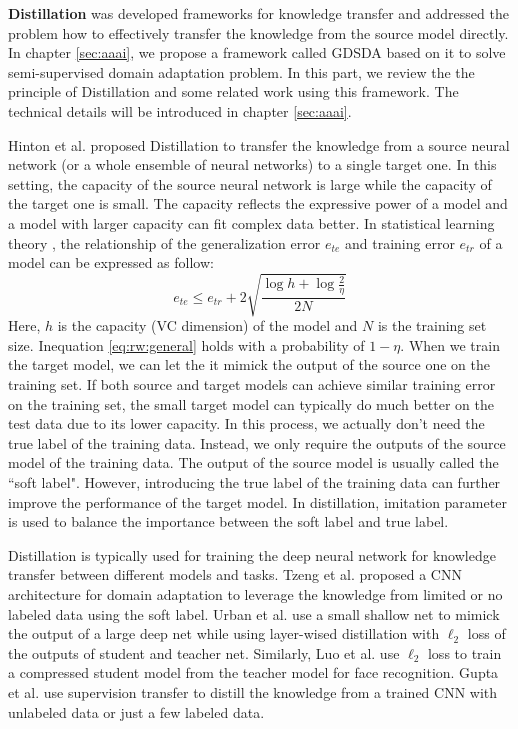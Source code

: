 \textbf{Distillation} \cite{hinton2015distilling} was developed frameworks for knowledge transfer and addressed the problem how to effectively transfer the knowledge from the source model directly. In chapter \ref{sec:aaai}, we propose a framework called GDSDA based on it to solve semi-supervised domain adaptation problem. In this part, we review the the principle of Distillation and some related work using this framework. The technical details will be introduced in chapter \ref{sec:aaai}.

Hinton et al. proposed Distillation to transfer the knowledge from a source neural network (or a whole ensemble of neural networks) to a single target one. In this setting, the capacity of the source neural network is large while the capacity of the target one is small. The capacity reflects the expressive power of a model and a model with larger capacity can fit complex data better. In statistical learning theory \cite{vapnik1999overview}, the relationship of the generalization error $e_{te}$ and training error $e_{tr}$ of a model can be expressed as follow:
\begin{equation}\label{eq:rw:general}
e_{te}\leq e_{tr}+2\sqrt{\frac{\log h +\log\frac{2}{\eta}}{2N}}
\end{equation}
Here, $h$ is the capacity (VC dimension) of the model and $N$ is the training set size. Inequation \ref{eq:rw:general} holds with a probability of $1-\eta$.
When we train the target model, we can let the it mimick the output of the source one on the training set. If both source and target models can achieve similar training error on the training set, the small target model can typically do much better on the test data due to its lower capacity. In this process, we actually don't need the true label of the training data. Instead, we only require the outputs of the source model of the training data. The output of the source model is usually called the ``soft label". However, introducing the true label of the training data can further improve the performance of the target model. In distillation, imitation parameter is used to balance the importance between the soft label and true label.

Distillation is typically used for training the deep neural network for knowledge transfer between different models and tasks. Tzeng et al. \cite{Tzeng_2015_ICCV} proposed a CNN architecture for domain adaptation to leverage the knowledge from limited or no labeled data using the soft label. Urban et al. \cite{urban2016deep} use a small shallow net to mimick the output of a large deep net while using layer-wised distillation with $\ell_2$ loss of the outputs of student and teacher net. Similarly, Luo et al. \cite{luo2016face} use $\ell_2$ loss to train a compressed student model from the teacher model for face recognition. Gupta et al. \cite{Gupta_2016_CVPR} use supervision transfer to distill the knowledge from a trained CNN with unlabeled data or just a few labeled data.

